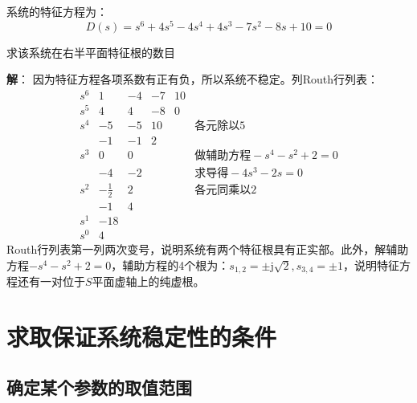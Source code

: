 \begin{example}
    系统的特征方程为：
    \begin{equation*}
        D(s) = s^6 + 4s^5 - 4s^4 + 4s^3 - 7s^2 - 8s + 10 = 0
    \end{equation*}

    求该系统在右半平面特征根的数目

    \textbf{解}： 因为特征方程各项系数有正有负，所以系统不稳定。列Routh行列表：
    \begin{equation*}
        \begin{array}{cccccc}
            s^6 & 1             & -4 & -7 & 10 & \\
            s^5 & 4             & 4  & -8 & 0  & \\
            s^4 & -5            & -5 & 10 &    & \text{各元除以5}\\
                & -1            & -1 & 2  &    & \\
            s^3 & 0             & 0  &    &    & \text{做辅助方程}-s^4 -s^2 +2 = 0\\
                & -4            & -2 &    &    & \text{求导得}-4s^3 -2s = 0 \\
            s^2 & -\frac{1}{2}  & 2  &    &    & \text{各元同乘以2} \\
                & -1            & 4  &    &    &  \\
            s^1 & -18           &    &    &    &  \\
            s^0 & 4             &    &    &    &
        \end{array}
    \end{equation*}
    Routh行列表第一列两次变号，说明系统有两个特征根具有正实部。此外，解辅助方程$-s^4 -s^2 +2 = 0$，辅助方程的4个根为：$s_{1,2} = \pm \mathrm{j}\sqrt{2},s_{3,4} = \pm 1$，说明特征方程还有一对位于$S$平面虚轴上的纯虚根。
\end{example}

\section{求取保证系统稳定性的条件}

\subsection{确定某个参数的取值范围}

